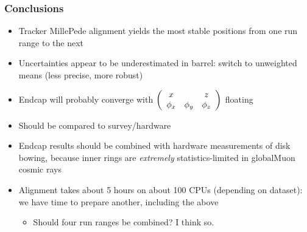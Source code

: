 \documentclass[compress]{beamer}
\begin{document}
\begin{frame}
\frametitle{Conclusions}
\begin{itemize}\setlength{\itemsep}{0.25 cm}

\item Tracker MillePede alignment yields the most stable positions
  from one run range to the next

\item Uncertainties appear to be underestimated in barrel: switch to
  unweighted means (less precise, more robust)

\item Endcap will probably converge with $\left(\begin{array}{c c c} x &  & z \\ \phi_x & \phi_y & \phi_z \end{array}\right)$ floating

\item Should be compared to survey/hardware

\item Endcap results should be combined with hardware measurements of
  disk bowing, because inner rings are {\it extremely}
  statistics-limited in globalMuon cosmic rays

\item Alignment takes about 5 hours on about 100 CPUs (depending on
  dataset): we have time to prepare another, including the above
\begin{itemize}
\item Should four run ranges be combined?  I think so.
\end{itemize}

\end{itemize}
\label{numpages}
\end{frame}
\end{document}
